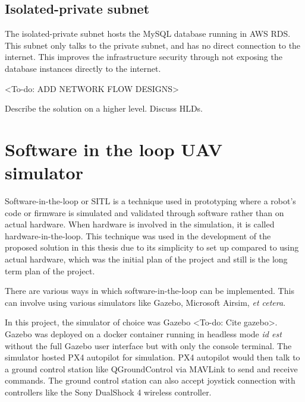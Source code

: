 


\subsection{Isolated-private subnet}
\label{isolated-private-subnet}

The isolated-private subnet hosts the MySQL database running in AWS RDS. This subnet only talks to the private subnet, and has no direct connection to the internet. This improves the infrastructure security through not exposing the database instances directly to the internet.

<To-do: ADD NETWORK FLOW DESIGNS>

Describe the solution on a higher level. Discuss HLDs.




\section{Software in the loop UAV simulator}
\label{sec:software-in-the-loop}

Software-in-the-loop or SITL is a technique used in prototyping where a robot's code or firmware is simulated and validated through software rather than on actual hardware. When hardware is involved in the simulation, it is called hardware-in-the-loop. This technique was used in the development of the proposed solution in this thesis due to its simplicity to set up compared to using actual hardware, which was the initial plan of the project and still is the long term plan of the project.

There are various ways in which software-in-the-loop can be implemented. This can involve using various simulators like Gazebo, Microsoft Airsim, \textit{et cetera}.

In this project, the simulator of choice was Gazebo <To-do: Cite gazebo>. Gazebo was deployed on a docker container running in headless mode \textit{id est} without the full Gazebo user interface but with only the console terminal. The simulator hosted PX4 autopilot for simulation. PX4 autopilot would then talk to a ground control station like QGroundControl via MAVLink to send and receive commands. The ground control station can also accept joystick connection with controllers like the Sony DualShock 4 wireless controller.

